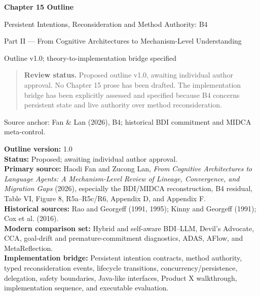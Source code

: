 


\thispagestyle{empty}
\begin{center}
\vspace*{2.2cm}
{\Huge\bfseries Chapter 15 Outline}\par
\vspace{0.7cm}
{\LARGE Persistent Intentions, Reconsideration and Method Authority: B4}\par
\vspace{0.8cm}
{\Large Part II --- From Cognitive Architectures to Mechanism-Level Understanding}\par
\vspace{1.2cm}
{\large Outline v1.0; theory-to-implementation bridge specified}\par
\vfill
\begin{minipage}{0.82\linewidth}
\begin{quote}
\textbf{Review status.} Proposed outline v1.0, awaiting individual author approval. No Chapter 15 prose has been drafted. The implementation bridge has been explicitly assessed and specified because B4 concerns persistent state and live authority over method reconsideration.
\end{quote}
\end{minipage}
\vfill
{\large Source anchor: Fan \& Lan (2026), B4; historical BDI commitment and MIDCA meta-control.}\par
\vspace{1cm}
\end{center}
\clearpage
\tableofcontents
\clearpage
{}
\setcounter{chapter}{14}
\setcounter{secnumdepth}{0}
\textbf{Outline version:} 1.0\\
\textbf{Status:} Proposed; awaiting individual author approval.\\
\textbf{Primary source:} Haodi Fan and Zucong Lan, \emph{From Cognitive Architectures to Language Agents: A Mechanism-Level Review of Lineage, Convergence, and Migration Gaps} (2026), especially the BDI/MIDCA reconstruction, B4 residual, Table VI, Figure 8, R5a--R5c/R6, Appendix D, and Appendix F.\\
\textbf{Historical sources:} Rao and Georgeff (1991, 1995); Kinny and Georgeff (1991); Cox et al. (2016).\\
\textbf{Modern comparison set:} Hybrid and self-aware BDI--LLM, Devil's Advocate, CCA, goal-drift and premature-commitment diagnostics, ADAS, AFlow, and MetaReflection.\\
\textbf{Implementation bridge:} Persistent intention contracts, method authority, typed reconsideration events, lifecycle transitions, concurrency/persistence, delegation, safety boundaries, Java-like interfaces, Product X walkthrough, implementation sequence, and executable evaluation.\\

\backmatter
\nocite{fanlan2026mechanisms,rao1991modelingbdi,rao1995bdi,kinny1991commitment,cox2016midca,owayyed2025controlled,lawton2026selfawarebdi,wang2024devilsadvocate,liang2025cca,arike2025goaldrift,mehta2026premature,hu2024adas,zhang2024aflow,gupta2024metareflection}
\printbibliography[heading=bibintoc,title={References}]

